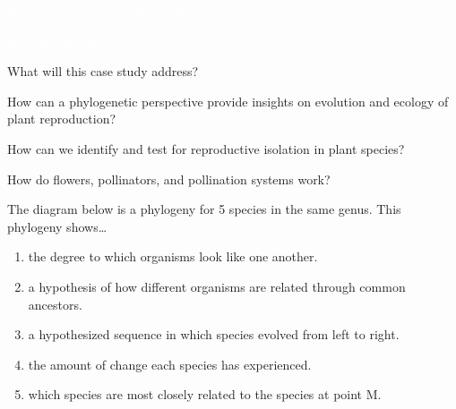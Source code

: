 \documentclass[t]{beamer}
\newcommand{\ques}[1]{\highlight{\textsc{q#1:}}}
\begin{document}
{
\begin{frame}[t]{\textcolor{white}{Reproductive isolation in columbines.}}

\vfilll

\tiny \textcolor{white}{KimonBerlin, Wikimedia }
\end{frame}
}
%
\begin{frame}[t]{What will this case study address?}

	\hangpara How can a phylogenetic perspective provide insights on evolution and ecology of plant reproduction?
	
	\hangpara How can we identify and test for reproductive isolation in plant species?

	\hangpara How do flowers, pollinators, and pollination systems work?

	 
\end{frame}
%
\begin{frame}[t]{\ques1 The diagram below is a phylogeny for 5 species in the same genus. This phylogeny shows\dots}
		
	\begin{enumerate}[label=\textsc{\alph*.}] %
		\item the degree to which organisms look like one another.
		
		\item a hypothesis of how different organisms are related through common ancestors.   

		\item a hypothesized sequence in which species evolved from left to right.

		\item the amount of change each species has experienced.

		\item which species are most closely related to the species at point M. 

	\end{enumerate}

\end{frame}
\end{document}

